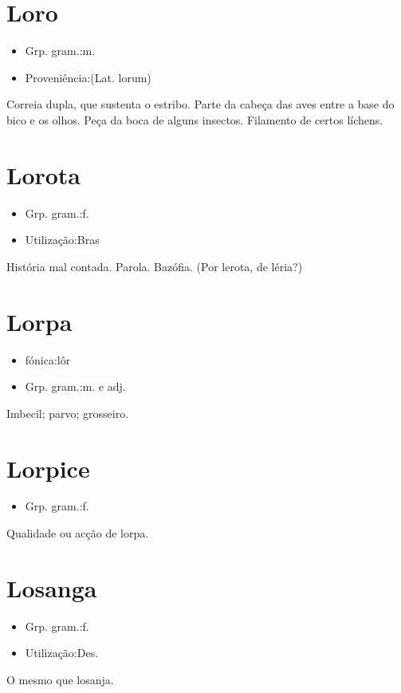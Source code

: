 \section{Loro}
\begin{itemize}
\item {Grp. gram.:m.}
\end{itemize}
\begin{itemize}
\item {Proveniência:(Lat. \textunderscore lorum\textunderscore )}
\end{itemize}
Correia dupla, que sustenta o estribo.
Parte da cabeça das aves entre a base do bico e os olhos.
Peça da boca de alguns insectos.
Filamento de certos líchens.
\section{Lorota}
\begin{itemize}
\item {Grp. gram.:f.}
\end{itemize}
\begin{itemize}
\item {Utilização:Bras}
\end{itemize}
História mal contada.
Parola.
Bazófia.
(Por \textunderscore lerota\textunderscore , de \textunderscore léria\textunderscore ?)
\section{Lorpa}
\begin{itemize}
\item {fónica:lôr}
\end{itemize}
\begin{itemize}
\item {Grp. gram.:m.  e  adj.}
\end{itemize}
Imbecil; parvo; grosseiro.
\section{Lorpice}
\begin{itemize}
\item {Grp. gram.:f.}
\end{itemize}
Qualidade ou acção de lorpa.
\section{Losanga}
\begin{itemize}
\item {Grp. gram.:f.}
\end{itemize}
\begin{itemize}
\item {Utilização:Des.}
\end{itemize}
O mesmo que \textunderscore losanja\textunderscore .
